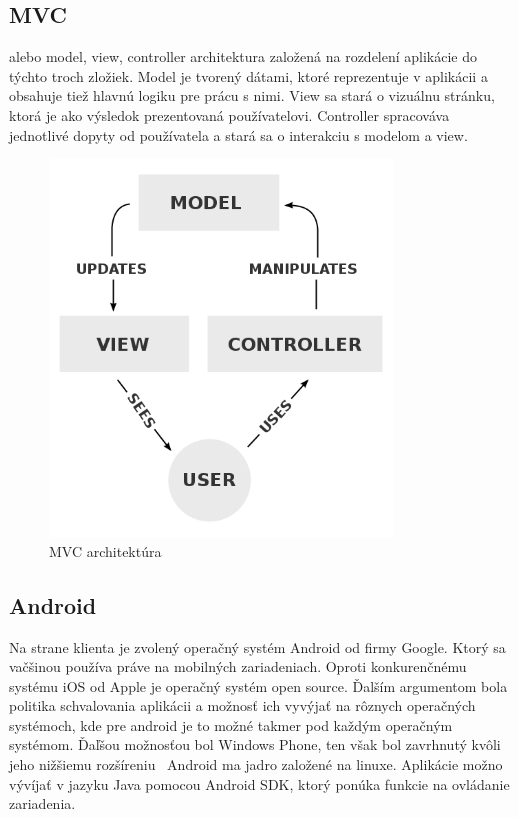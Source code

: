 \subsection{MVC} alebo model, view, controller architektura založená na rozdelení aplikácie do týchto troch zložiek. Model je tvorený dátami, ktoré reprezentuje v aplikácii a obsahuje tiež hlavnú logiku pre prácu s nimi. View sa stará o vizuálnu stránku, ktorá je ako výsledok prezentovaná používatelovi. Controller spracováva jednotlivé dopyty od používatela a stará sa o interakciu s modelom a view.
\begin{figure}[h]
  \centering
  \includegraphics[height=10cm]{mainmatter/imgs/mvc.png}
  \caption{MVC architektúra}
  \label{fig:comenius}
\end{figure}

\subsection{Android} Na strane klienta je zvolený operačný systém Android od firmy Google. Ktorý sa vačšinou používa práve na mobilných zariadeniach. Oproti konkurenčnému systému iOS od Apple je operačný systém open source. Ďalším argumentom bola politika schvalovania aplikácii a možnosť ich vyvýjať na rôznych operačných systémoch, kde pre android je to možné takmer pod každým operačným systémom. Ďaľšou možnosťou bol Windows Phone, ten však bol zavrhnutý kvôli jeho nižšiemu rozšíreniu \
Android ma jadro založené na linuxe. Aplikácie možno vývíjať v jazyku Java pomocou Android SDK, ktorý ponúka funkcie na ovládanie zariadenia.


